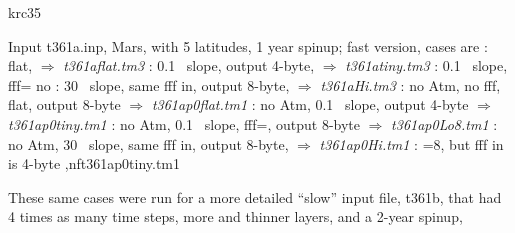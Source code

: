 \documentclass{article}
\newcommand{\qfo}[1]{$\Longrightarrow$ \textit{#1}} %
\begin{document}
krc35

Input t361a.inp, Mars, with 5 latitudes, 1 year spinup; fast version, cases are
: flat, \qfo{t361aflat.tm3}
:  0.1\qd~ slope, output 4-byte, \qfo{t361atiny.tm3}
: 0.1\qd~ slope, fff=  no 
: 30\qd~ slope, same fff in, output 8-byte, \qfo{t361aHi.tm3}
: no Atm, no fff, flat, output 8-byte \qfo{t361ap0flat.tm1}
: no Atm, 0.1\qd~ slope, output 4-byte \qfo{t361ap0tiny.tm1} 
: no Atm, 0.1\qd~ slope, fff=, output 8-byte \qfo{t361ap0Lo8.tm1} 
:  no Atm, 30\qd~ slope, same fff in, output 8-byte, \qfo{t361ap0Hi.tm1}
: =8, but fff in is 4-byte ,nf{t361ap0tiny.tm1}

These same cases were run for a more detailed ``slow'' input file, t361b, that had 4 times as many time steps, more and thinner layers, and a 2-year spinup, 
\end{document}
